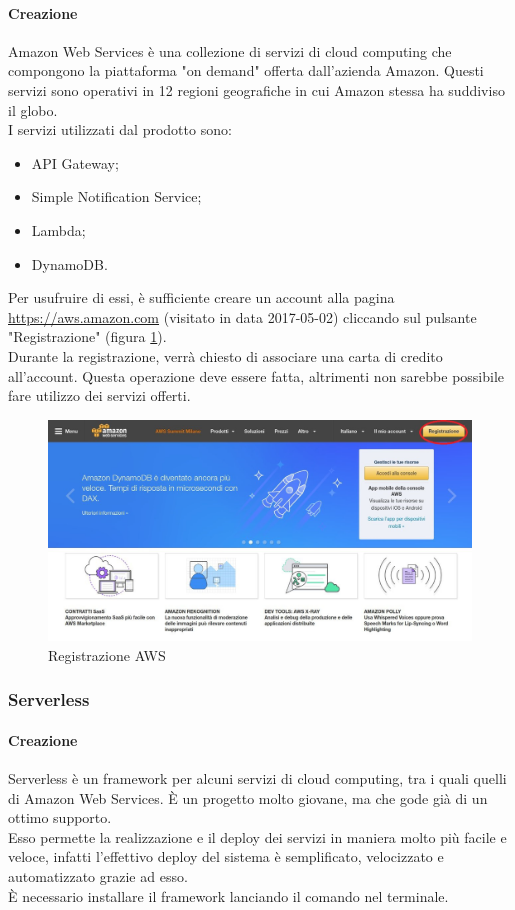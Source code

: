 \paragraph{Creazione}
Amazon Web Services è una collezione di servizi di cloud computing che compongono la piattaforma "on demand" offerta dall'azienda Amazon. Questi servizi sono operativi in 12 regioni geografiche in cui Amazon stessa ha suddiviso il globo.\\
I servizi utilizzati dal prodotto sono:
\begin{itemize}
	\item API Gateway;
	\item Simple Notification Service;
	\item Lambda;
	\item DynamoDB.
\end{itemize}
Per usufruire di essi, è sufficiente creare un account alla pagina \url{https://aws.amazon.com} (visitato in data 2017-05-02) cliccando sul pulsante "Registrazione" (figura \ref{fig:aws}). \\
Durante la registrazione, verrà chiesto di associare una carta di credito all'account. Questa operazione deve essere fatta, altrimenti non sarebbe possibile fare utilizzo dei servizi offerti.
\begin{figure}[h]
\includegraphics[width=\textwidth,height=\textheight,keepaspectratio]{sezioni/images/aws.jpg}
\caption{Registrazione AWS}\label{fig:aws}
\end{figure}
\newpage
\subsubsection{Serverless}
\paragraph{Creazione}
Serverless è un framework per alcuni servizi di cloud computing, tra i quali quelli di Amazon Web Services. È un progetto molto giovane, ma che gode già di un ottimo supporto.\\
Esso permette la realizzazione e il deploy dei servizi in maniera molto più facile e veloce, infatti l'effettivo deploy del sistema è semplificato, velocizzato e automatizzato grazie ad esso. \\
È necessario installare il framework lanciando il comando  nel terminale.

